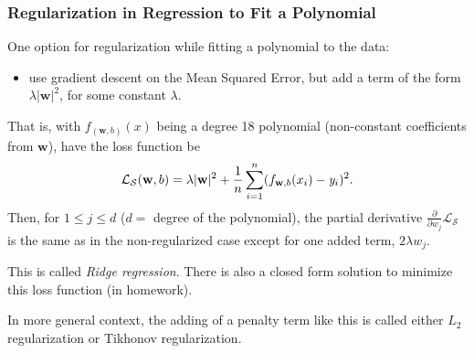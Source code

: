 \documentclass[smaller]{beamer}
\theoremstyle{example}
\newcommand{\ix}[1]{{\it #1}}
\begin{document}
\begin{frame}
    \frametitle{Regularization in Regression to Fit a Polynomial}
    One option for regularization while fitting a polynomial to the data: 
    \begin{itemize}
        \item use gradient descent on the Mean Squared Error, but add a term of the form $\lambda|\textbf{w}|^2$, for some constant $\lambda$. 
    \end{itemize}
    \pause
    That is, with $f_{(\textbf{w}, b)}(x)$ being a degree 18 polynomial (non-constant coefficients from $\textbf{w}$), have the loss function be 
        \[\mathcal L_{\mathcal S}(\textbf{w}, b) = \lambda|\textbf{w}|^2 + \frac{1}n\sum_{i=1}^n (f_{\textbf{w}, b}(x_i) - \ix y_i)^2.\]
    \pause
    Then, for $1\le j\le d$ ($d = $ degree of the polynomial), the partial derivative $\frac{\partial}{\partial w_j}\mathcal L_{\mathcal S}$ is the same as in the non-regularized case except for one added term, $2\lambda w_j$.

    \pause
    This is called \textit{Ridge regression}. There is also a closed form solution to minimize this loss function (in homework). 
    
    \pause
    In more general context, the adding of a penalty term like this is called either $L_2$ regularization or Tikhonov regularization. 
\end{frame}
\end{document}
